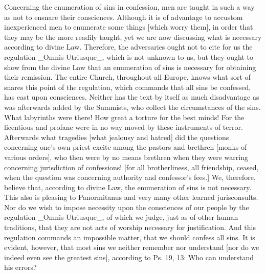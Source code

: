 Concerning the enumeration of sins in confession, men are taught in
such a way as not to ensnare their consciences.  Although it is of
advantage to accustom inexperienced men to enumerate some things
[which worry them], in order that they may be the more readily taught,
yet we are now discussing what is necessary according to divine Law.
Therefore, the adversaries ought not to cite for us the regulation
_Omnis Utriusque_, which is not unknown to us, but they ought to show
from the divine Law that an enumeration of sins is necessary for
obtaining their remission.  The entire Church, throughout all Europe,
knows what sort of snares this point of the regulation, which
commands that all sins be confessed, has east upon consciences.
Neither has the text by itself as much disadvantage as was afterwards
added by the Summists, who collect the circumstances of the sins.
What labyrinths were there!  How great a torture for the best minds!
For the licentious and profane were in no way moved by these
instruments of terror.  Afterwards what tragedies [what jealousy and
hatred] did the questions concerning one's own priest excite among
the pastors and brethren [monks of various orders], who then were by
no means brethren when they were warring concerning jurisdiction of
confessions! [for all brotherliness, all friendship, ceased, when the
question was concerning authority and confessor's fees.] We,
therefore, believe that, according to divine Law, the enumeration of
sins is not necessary.  This also is pleasing to Panormitanus and
very many other learned jurisconsults.  Nor do we wish to impose
necessity upon the consciences of our people by the regulation _Omnis
Utriusque_, of which we judge, just as of other human traditions,
that they are not acts of worship necessary for justification.  And
this regulation commands an impossible matter, that we should confess
all sins.  It is evident, however, that most sins we neither remember
nor understand [nor do we indeed even see the greatest sins],
according to Ps. 19, 13: Who can understand his errors?

